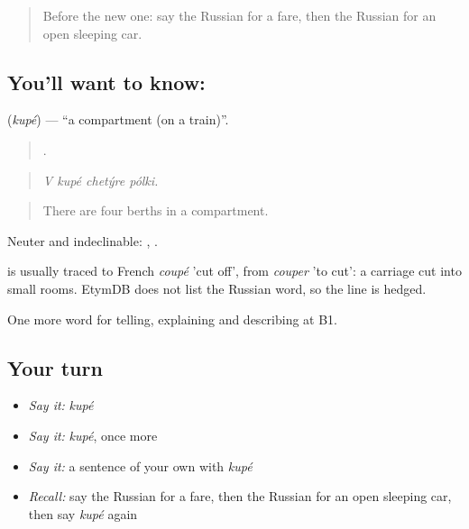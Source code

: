 \label{lesson:RU-C413-kupe}



\begin{quote}
Before the new one: say the Russian for a fare, then the Russian for an open sleeping car.
\end{quote}

\subsection*{You'll want to know: }
\textbf{} (\emph{kupé}) — \textquotedblleft{}a compartment (on a train)\textquotedblright{}.

\begin{quote}
   .
\end{quote}

\begin{quote}
\emph{V kupé chetýre pólki.}
\end{quote}

\begin{quote}
There are four berths in a compartment.
\end{quote}

Neuter and indeclinable: \emph{ }, \emph{ }.

\begin{cousinweb}
\emph{} is usually traced to French \emph{coupé} 'cut off', from \emph{couper} 'to cut': a carriage cut into small rooms. EtymDB does not list the Russian word, so the line is hedged.
\end{cousinweb}

\begin{grammarlens}[title={What you've built}]
One more word for telling, explaining and describing at B1.
\end{grammarlens}

\subsection*{Your turn}
\begin{itemize}
\raggedright
  \item \emph{Say it:} \emph{kupé}
  \item \emph{Say it:} \emph{kupé}, once more
  \item \emph{Say it:} a sentence of your own with \emph{kupé}
  \item \emph{Recall:} say the Russian for a fare, then the Russian for an open sleeping car, then say \emph{kupé} again
\end{itemize}

